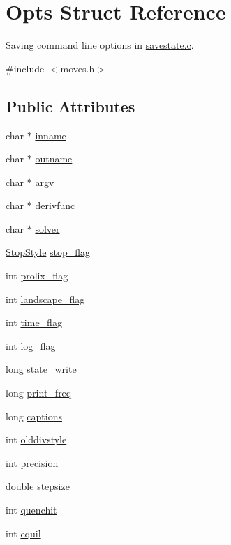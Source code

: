 \hypertarget{structOpts}{
\section{Opts Struct Reference}
\label{structOpts}
}


Saving command line options in \hyperlink{savestate_8c}{savestate.c}.  


{\ttfamily \#include $<$moves.h$>$}\subsection*{Public Attributes}
\begin{DoxyCompactItemize}
\item 
char $\ast$ \hyperlink{structOpts_ad99220ebb24e6d311d853d8255a79e13}{inname}
\item 
char $\ast$ \hyperlink{structOpts_a8c98c4d3ed9b5b8755492a5bf86ff7e8}{outname}
\item 
char $\ast$ \hyperlink{structOpts_a2bcc37ebf3132c2b74b1cbc8456d4241}{argv}
\item 
char $\ast$ \hyperlink{structOpts_a2071490329894a70e89a365d741a9a23}{derivfunc}
\item 
char $\ast$ \hyperlink{structOpts_a5b1e7650a6cf1b1b4175c1d9b184b6e7}{solver}
\item 
\hyperlink{sa_8h_a6342f2cfe7bf17936624248b72b6ccb9}{StopStyle} \hyperlink{structOpts_aa3c1c207619bfefd825aebdc7717fcc2}{stop\_\-flag}
\item 
int \hyperlink{structOpts_a259229609e2fabbe5afa91e93d2fc03b}{prolix\_\-flag}
\item 
int \hyperlink{structOpts_a3a9551ff976b4180e8ac352f2fc8b869}{landscape\_\-flag}
\item 
int \hyperlink{structOpts_a9592fe5904bc813ae316fe95a0711053}{time\_\-flag}
\item 
int \hyperlink{structOpts_aa63b824d53d3f985907932c8b0b08459}{log\_\-flag}
\item 
long \hyperlink{structOpts_afa529855a6022f4a55aaac3e4ad2d9be}{state\_\-write}
\item 
long \hyperlink{structOpts_aeebb3ff1e19473c5bb4a1b94132e9122}{print\_\-freq}
\item 
long \hyperlink{structOpts_ab153e3d261a7b7daf5a566f25bf539a9}{captions}
\item 
int \hyperlink{structOpts_afc63836d11f4dfad0be0cadd2d9f7eb0}{olddivstyle}
\item 
int \hyperlink{structOpts_a0bad34844ab97c5e2b1c5f1d5728d7d1}{precision}
\item 
double \hyperlink{structOpts_a07ca2da10f7f5172c8e3f2b3f684e72d}{stepsize}
\item 
int \hyperlink{structOpts_ac7fcc1b8cfc84f1e0b8d68fd73e81e37}{quenchit}
\item 
int \hyperlink{structOpts_a50f9595cc355bb8091848d039763518e}{equil}
\end{DoxyCompactItemize}


